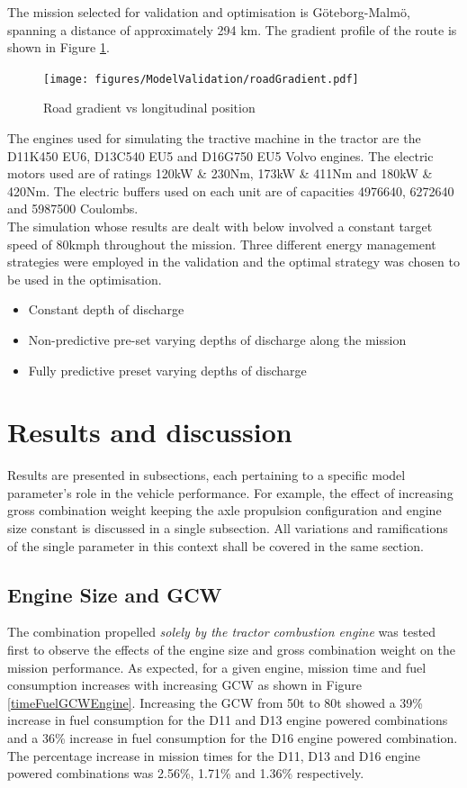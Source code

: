 \documentclass[ExampleMasters.tex]{subfiles}
\begin{document}
The mission selected for validation and optimisation is G\"oteborg-Malm\"o, spanning a distance of approximately 294 km. The gradient profile of the route is shown in Figure \ref{roadGradient}.

\begin{figure}[h!]
\centering
\texttt{[image: figures/ModelValidation/roadGradient.pdf]}
\caption{Road gradient vs longitudinal position}
\label{roadGradient}
\end{figure}

The engines used for simulating the tractive machine in the tractor are the D11K450 EU6, D13C540 EU5 and D16G750 EU5 Volvo engines. The electric motors used are of ratings 120kW \& 230Nm, 173kW \& 411Nm and  180kW \& 420Nm. The electric buffers used on each unit are of capacities 4976640, 6272640 and 5987500 Coulombs.\\

The simulation whose results are dealt with below involved a constant target speed of 80kmph throughout the mission. Three different energy management strategies were employed in the validation and the optimal strategy was chosen to be used in the optimisation. 

\begin{itemize}
\item Constant depth of discharge
\item Non-predictive pre-set varying depths of discharge along the mission
\item Fully predictive preset varying depths of discharge
\end{itemize}

\section{Results and discussion}
Results are presented in subsections, each pertaining to a specific model parameter's role in the vehicle performance. For example, the effect of increasing gross combination weight keeping the axle propulsion configuration and engine size constant is discussed in a single subsection. All variations and ramifications of the single parameter in this context shall be covered in the same section.

\subsection{Engine Size and GCW}
The combination propelled \textit{solely by the tractor combustion engine} was tested first to observe the effects of the engine size and gross combination weight on the mission performance. As expected, for a given engine, mission time and fuel consumption increases with increasing GCW as shown in Figure \ref{timeFuelGCWEngine}. Increasing the GCW from 50t to 80t showed a 39\% increase in fuel consumption for the D11 and D13 engine powered combinations and a 36\% increase in fuel consumption for the D16 engine powered combination. The percentage increase in mission times for the D11, D13 and D16 engine powered combinations was 2.56\%, 1.71\% and 1.36\% respectively.\\
\end{document}
